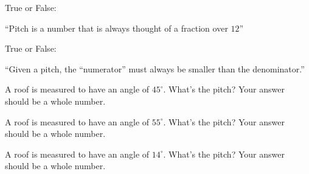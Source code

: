 \documentclass[noauthor,nooutcomes]{ximera}
\author{Bart Snapp}
\begin{document}
\maketitle


\begin{exercise}
  True or False:

  ``Pitch is a number that is always thought of a fraction over $12$''

  
\end{exercise}


\begin{exercise}
  True or False:
  
  ``Given a pitch, the ``numerator'' must always be smaller than the denominator.''
\end{exercise}

\begin{exercise}
  A roof is measured to have an angle of $45^\circ$. What's the pitch?
  Your answer should be a whole number.
\end{exercise}


\begin{exercise}
    A roof is measured to have an angle of $55^\circ$. What's the pitch?
  Your answer should be a whole number.
\end{exercise}



\begin{exercise}
  A roof is measured to have an angle of $14^\circ$. What's the pitch?
  Your answer should be a whole number.
\end{exercise}



\end{document}
